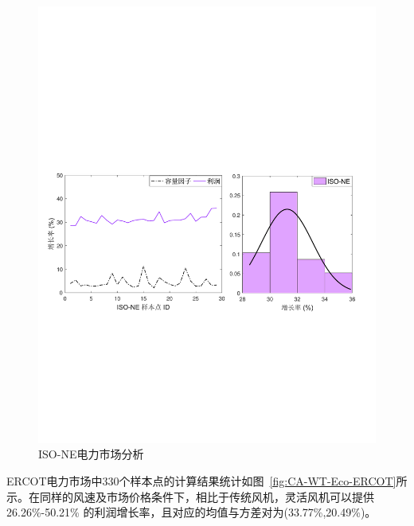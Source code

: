 \begin{figure}[H] %
  \centering
  \includegraphics[scale=0.70]{figures/Chap5-18-CA-WT-Eco-ISONE.pdf}
  \caption{ISO-NE电力市场分析}
  \label{fig:CA-WT-Eco-ISONE}
\end{figure}

ERCOT电力市场中330个样本点的计算结果统计如图~\ref{fig:CA-WT-Eco-ERCOT}所示。在同样的风速及市场价格条件下，相比于传统风机，灵活风机可以提供  26.26\%-50.21\% 的利润增长率，且对应的均值与方差对为(33.77\%,20.49\%)。


